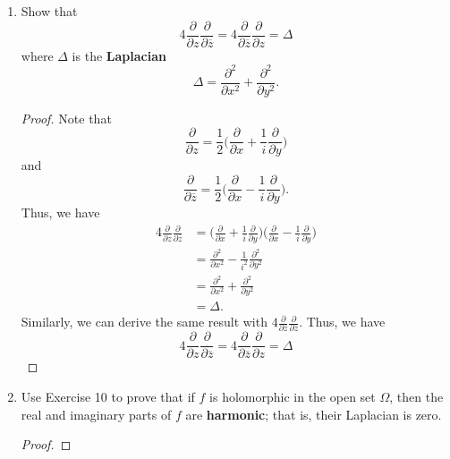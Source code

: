 \documentclass[11pt,a4paper]{book}
\begin{document}
\begin{enumerate}
\begin{proof}
        \end{proof}
    \item Show that 
        \[  4 \frac{\partial  }{\partial z  }  \frac{\partial  }{\partial \overline{z} } = 4 \frac{\partial  }{\partial \overline{z} }  \frac{\partial  }{\partial z }  = \Delta   \]
        where \( \Delta  \) is the \textbf{Laplacian}
        \[ \Delta = \frac{\partial^{2}  }{\partial x^{2} } + \frac{\partial^{2} }{\partial  y^{2} }.     \]
        \begin{proof}
        Note that
        \[  \frac{\partial  }{\partial z }  = \frac{ 1 }{ 2 }  \Big(  \frac{\partial  }{\partial x }  + \frac{ 1 }{ i }  \frac{\partial  }{\partial y }  \Big) \]
        and 
        \[  \frac{\partial  }{\partial \overline{z} }  = \frac{ 1 }{ 2 }  \Big( \frac{\partial  }{\partial x }  - \frac{ 1  }{ i }  \frac{\partial  }{\partial y }   \Big).  \]
        Thus, we have
        \begin{align*}
            4 \frac{\partial  }{\partial z }  \frac{\partial  }{\partial \overline{z} } &=   \Big( \frac{\partial  }{\partial x }  + \frac{ 1 }{ i }  \frac{\partial  }{\partial y }   \Big) \Big(  \frac{\partial  }{\partial x }  - \frac{ 1 }{ i }  \frac{\partial  }{\partial y }  \Big) \\
                                                                                        &= \frac{\partial^{2} }{\partial x^{2} }  - \frac{ 1 }{ i^{2} } \frac{\partial^{2} }{\partial y^{2} }  \\
                                                                                        &= \frac{\partial^{2} }{\partial x^{2} }  +  \frac{\partial^{2} }{\partial y^{2} }  \\
                                                                                        &= \Delta.
        \end{align*}
        Similarly, we can derive the same result with \( 4 \frac{\partial  }{\partial \overline{z} } \frac{\partial  }{\partial z }  \). Thus, we have  
        \[  4 \frac{\partial  }{\partial z  }  \frac{\partial  }{\partial \overline{z} } = 4 \frac{\partial  }{\partial \overline{z} }  \frac{\partial  }{\partial z }  = \Delta   \]
        \end{proof}
    \item Use Exercise 10 to prove that if \( f  \) is holomorphic in the open set \( \Omega \), then the real and imaginary parts of \( f  \) are \textbf{harmonic}; that is, their Laplacian is zero.
        \begin{proof}

\end{proof}
\end{enumerate}
\end{document}
